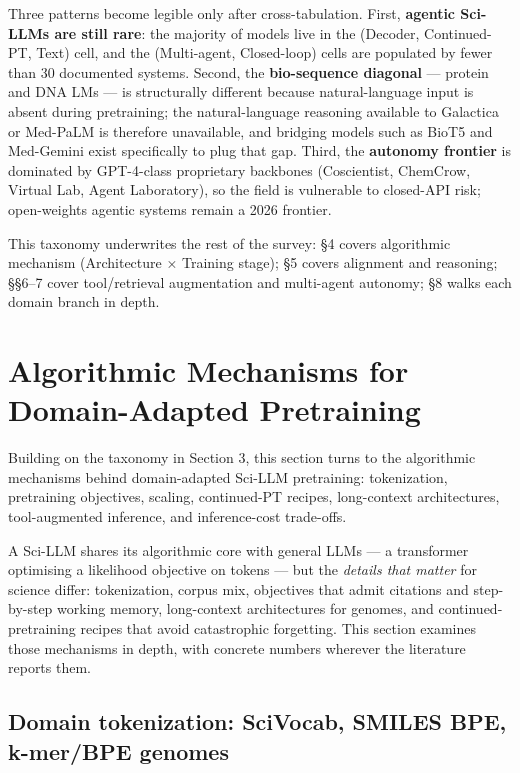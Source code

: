 \documentclass{article}
\begin{document}
Three patterns become legible only after cross-tabulation. First, \textbf{agentic Sci-LLMs are still rare}: the majority of models live in the (Decoder, Continued-PT, Text) cell, and the (Multi-agent, Closed-loop) cells are populated by fewer than 30 documented systems. Second, the \textbf{bio-sequence diagonal} --- protein and DNA LMs --- is structurally different because natural-language input is absent during pretraining; the natural-language reasoning available to Galactica or Med-PaLM is therefore unavailable, and bridging models such as BioT5 and Med-Gemini exist specifically to plug that gap. Third, the \textbf{autonomy frontier} is dominated by GPT-4-class proprietary backbones (Coscientist, ChemCrow, Virtual Lab, Agent Laboratory), so the field is vulnerable to closed-API risk; open-weights agentic systems remain a 2026 frontier.

This taxonomy underwrites the rest of the survey: §4 covers algorithmic mechanism (Architecture × Training stage); §5 covers alignment and reasoning; §§6--7 cover tool/retrieval augmentation and multi-agent autonomy; §8 walks each domain branch in depth.

\section{Algorithmic Mechanisms for Domain-Adapted Pretraining}\label{algorithmic-mechanisms-for-domain-adapted-pretraining}

Building on the taxonomy in Section 3, this section turns to the algorithmic mechanisms behind domain-adapted Sci-LLM pretraining: tokenization, pretraining objectives, scaling, continued-PT recipes, long-context architectures, tool-augmented inference, and inference-cost trade-offs.

A Sci-LLM shares its algorithmic core with general LLMs --- a transformer optimising a likelihood objective on tokens --- but the \emph{details that matter} for science differ: tokenization, corpus mix, objectives that admit citations and step-by-step working memory, long-context architectures for genomes, and continued-pretraining recipes that avoid catastrophic forgetting. This section examines those mechanisms in depth, with concrete numbers wherever the literature reports them.

\subsection{Domain tokenization: SciVocab, SMILES BPE, k-mer/BPE genomes}\label{domain-tokenization-scivocab-smiles-bpe-k-merbpe-genomes}
\end{document}
